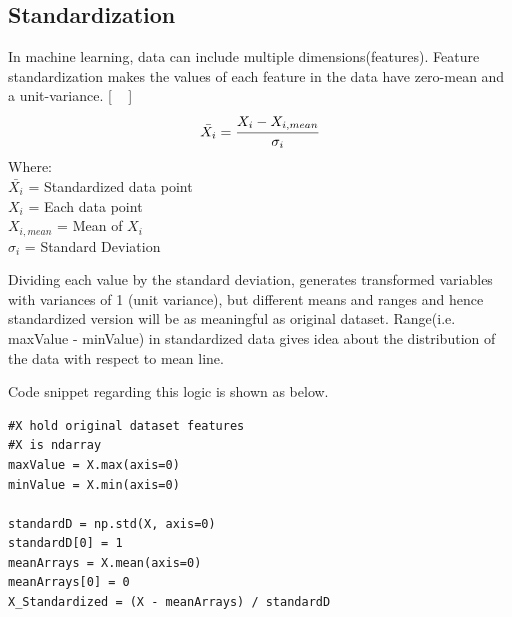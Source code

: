 \documentclass{article}
\begin{document}
\subsection{Standardization}
In machine learning, data can include multiple dimensions(features). Feature standardization makes the values of each feature in the data have zero-mean and a unit-variance. 
[ ~\citep{Online3} ]
\begin{equation} \label{eq:3}
\bar{X_{i}} = \cfrac{X_i - X_{i, mean}}{ \sigma_i}
\end{equation}
Where:\\
\(\bar{X_{i}}\) = Standardized data point\\
\(X_i\) = Each data point\\
\(X_{i, mean}\) = Mean of \(X_i\)\\
\(\sigma_i\) = Standard Deviation \\



\par Dividing each value by the standard deviation, generates transformed variables with variances of 1 (unit variance), but different means and ranges and hence standardized version will be as meaningful as original dataset. Range(i.e. maxValue - minValue) in standardized data gives idea about the distribution of the data with respect to mean line.

\par Code snippet regarding this logic is shown as below.
\begin{lstlisting}
#X hold original dataset features
#X is ndarray
maxValue = X.max(axis=0)
minValue = X.min(axis=0)
    
standardD = np.std(X, axis=0)
standardD[0] = 1
meanArrays = X.mean(axis=0) 
meanArrays[0] = 0
X_Standardized = (X - meanArrays) / standardD
\end{lstlisting}
\end{document}
